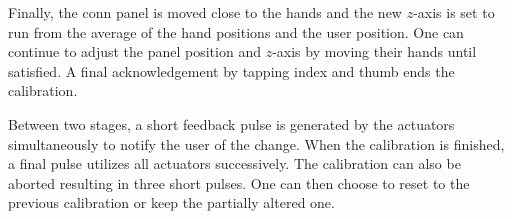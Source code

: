 \documentclass[hyperref, bachelorofscience]{cgvpub}
\begin{document}
Finally, the conn panel is moved close to the hands and the new $ z $-axis is set to run from the average of the hand positions and the user position. One can continue to adjust the panel position and $ z $-axis by moving their hands until satisfied. A final acknowledgement by tapping index and thumb ends the calibration.

Between two stages, a short feedback pulse  is generated by the actuators simultaneously to notify the user of the change. When the calibration is finished, a final pulse utilizes all actuators successively. The calibration can also be aborted resulting in three short pulses. One can then choose to reset to the previous calibration or keep the partially altered one.

\printglossary[type=gloss_terms]
\printglossary[type=gloss_acr]
\end{document}
